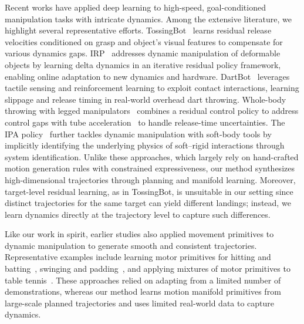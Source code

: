 \documentclass[letterpaper, 10 pt, conference]{ieeeconf}  %
\begin{document}
Recent works have applied deep learning to high-speed, goal-conditioned manipulation tasks with intricate dynamics. 
Among the extensive literature, we highlight several representative efforts. 
TossingBot~\cite{zeng2019tossingbot} learns residual release velocities conditioned on grasp and object's visual features to compensate for various dynamics gaps. 
IRP~\cite{chi2022irp} addresses dynamic manipulation of deformable objects by learning delta dynamics in an iterative residual policy framework, enabling online adaptation to new dynamics and hardware. 
DartBot~\cite{aslam2025dartbot} leverages tactile sensing and reinforcement learning to exploit contact interactions, learning slippage and release timing in real-world overhead dart throwing. 
Whole-body throwing with legged manipulators~\cite{ma2025learningaccuratewholebodythrowing} combines a residual control policy to address control gaps with tube acceleration~\cite{liu2024tubeacceleration} to handle release-time uncertainties. 
The IPA policy~\cite{wang2025ipa} further tackles dynamic manipulation with soft-body tools by implicitly identifying the underlying physics of soft–rigid interactions through system identification.
Unlike these approaches, which largely rely on hand-crafted motion generation rules with constrained expressiveness, our method synthesizes high-dimensional trajectories through planning and manifold learning.
Moreover, target-level residual learning, as in TossingBot, is unsuitable in our setting since distinct trajectories for the same target can yield different landings; instead, we learn dynamics directly at the trajectory level to capture such differences.

Like our work in spirit, earlier studies also applied movement primitives to dynamic manipulation to generate smooth and consistent trajectories. 
Representative examples include learning motor primitives for hitting and batting~\cite{kober2010icra}, swinging and padding~\cite{kober2009icra}, and applying mixtures of motor primitives to table tennis~\cite{muelling2010mixtureofmotorprimitives, mulling2013ijrr}.
These approaches relied on adapting from a limited number of demonstrations, whereas our method learns motion manifold primitives from large-scale planned trajectories and uses limited real-world data to capture dynamics.

\end{document}
